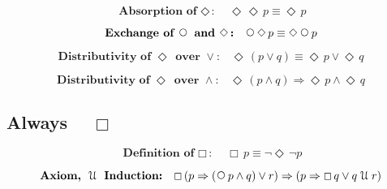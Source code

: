 \documentclass[12pt, fleqn, leqno]{article}
\newcommand{\impl}{\ensuremath{\Rightarrow}}        %
\newcommand{\Until}{\;\mathcal{U}\;}
\newcommand{\Next}{\;\,\text{\raisebox{3.5pt}{\circle{6}}}}
\newcommand{\Event}{\Diamond\,}
\newcommand{\Always}{\Box\,}
\newcommand{\spacer}{\vspace{-30pt}}
\newcommand{\firstspacer}{\vspace{-26pt}}
\begin{document}
\spacer

\begin{equation}\label{E:IdemEvent}
\textbf{Absorption of $\Event$:}\quad \Event\Event p \equiv \Event p
\end{equation}

\spacer

\begin{equation}\label{E:dNextEvent}
\textbf{Exchange of $\Next$ and $\Event$:}\quad \Next\Event p \equiv \Event\Next p
\end{equation}

\spacer

\begin{equation}\label{E:distEventOr}
\textbf{Distributivity of $\Event$ over $\lor$:}\quad \Event(p \lor q) \equiv \Event p \lor \Event q
\end{equation}

\spacer

\begin{equation}\label{E:distEventAnd}
\textbf{Distributivity of $\Event$ over $\land$:}\quad \Event(p \land q) \impl \Event p \land \Event q
\end{equation}

\subsection*{Always $\quad\Always$}

\begin{equation}\label{E:defAlways}
\textbf{Definition of $\Always$:}\quad \Always p \equiv \neg\Event\neg p
\end{equation}

\firstspacer

\begin{equation}\label{E:untilInduction1}
\textbf{Axiom, $\Until$ Induction:}\quad \Always (p \impl (\Next p\land q)\lor r) \impl (p \impl \Always q\lor q\Until r)
\end{equation}
\end{document}
